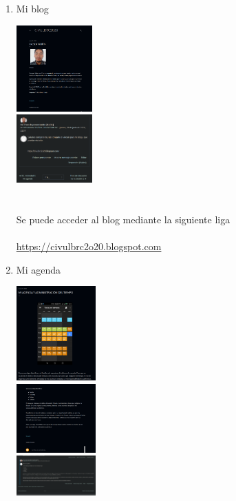 \documentclass[12pt]{article}
\begin{document}
\begin{enumerate}[{\bf Sesi\'on} 1{.}]
\begin{enumerate}[{\bf Actividad} 1{.}]
				\item {Mi blog}
					\begin{multicols}{3}			
						\includegraphics[width=0.23\textwidth] {CIVUL-U1-S1-A3-1}\\
						\includegraphics[width=0.23\textwidth] {CIVUL-U1-S1-A3-2}\\\\\\
						Se puede acceder al blog mediante la siguiente liga \\
						\huge\\ \url{https://civulbrc2o20.blogspot.com} \\\normalsize
					\end{multicols}
					
				\item {Mi agenda}
					\begin{multicols}{3}			
						\includegraphics[width=0.24\textwidth] {CIVUL-U1-S1-A4-1}\\
						\includegraphics[width=0.24\textwidth] {CIVUL-U1-S1-A4-2}\\
						\includegraphics[width=0.24\textwidth] {CIVUL-U1-S1-A4-3}
					\end{multicols}
			\end{enumerate}



\end{enumerate}
\end{document}
